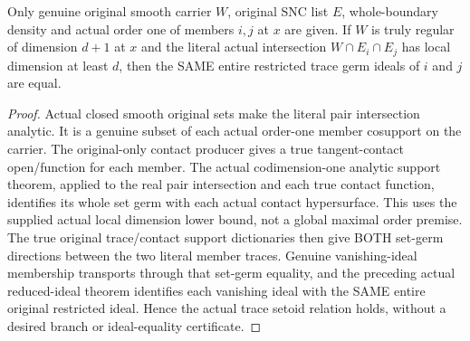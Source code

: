 \begin{theorem}
\label{hir:sharp-original-pair-dimension-gives-actual-trace-ideal-equality}
\leanok
Only genuine original smooth carrier $W$, original SNC list $E$, whole-boundary
density and actual order one of members $i,j$ at $x$ are given. If $W$ is truly
regular of dimension $d+1$ at $x$ and the literal actual intersection
$W\cap E_i\cap E_j$ has local dimension at least $d$, then the SAME entire
restricted trace germ ideals of $i$ and $j$ are equal.
\end{theorem}
\begin{proof}
Actual closed smooth original sets make the literal pair intersection analytic.
It is a genuine subset of each actual order-one member cosupport on the
carrier. The original-only contact producer gives a true tangent-contact
open/function for each member. The actual codimension-one analytic support
theorem, applied to the real pair intersection and each true contact function,
identifies its whole set germ with each actual contact hypersurface. This
uses the supplied actual local dimension lower bound, not a global maximal
order premise. The true original trace/contact support dictionaries then give
BOTH set-germ directions between the two literal member traces. Genuine
vanishing-ideal membership transports through that set-germ equality, and the
preceding actual reduced-ideal theorem identifies each vanishing ideal with
the SAME entire original restricted ideal. Hence the actual trace setoid
relation holds, without a desired branch or ideal-equality certificate.
\end{proof}

